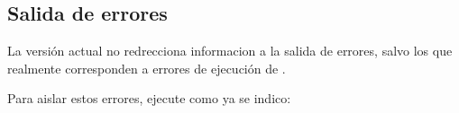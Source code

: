 \subsection{Salida de errores}
La versi\'on actual no redrecciona informacion a la salida de errores, salvo los que realmente corresponden a errores de ejecuci\'on de \lpmd.

Para aislar estos errores, ejecute \lpmd como ya se indico:


